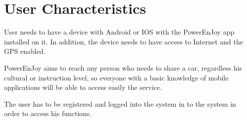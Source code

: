 \section{User Characteristics}
User needs to have a device with Android or IOS with the PowerEnJoy app installed on it.
In addition, the device needs to have access to Internet and the GPS enabled.

PowerEnJoy aims to reach any person who needs to share a car, regardless his cultural or instruction level, so everyone with a basic knowledge of mobile applications will be able to access easily the service.

The user has to be registered and logged into the system in to the system in order to access his functions.
